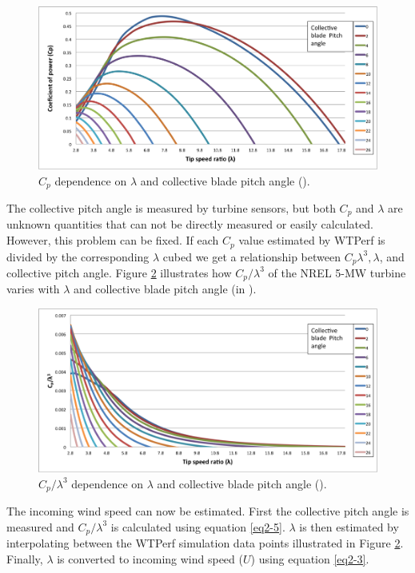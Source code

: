 \begin{figure}[ht]
	\centering
		\includegraphics[width=\textwidth]{Figures/ch2Figures/fig2-13.png}
		
	\caption{$C_p$ dependence on $\lambda$ and collective blade pitch angle (\degree).}
	\label{fig2-13}
\end{figure}

The collective pitch angle is measured by turbine sensors, but both $C_p$ and $\lambda$ are unknown quantities that can not be directly measured or easily calculated. However, this problem can be fixed. If each $C_p$ value estimated by WTPerf is divided by the corresponding $\lambda$ cubed we get a relationship between $C_p\lambda^3, \lambda$, and collective pitch angle. Figure \ref{fig2-14}  illustrates how $C_p / \lambda^3$ of the NREL 5-MW turbine varies with $\lambda$ and collective blade pitch angle (in \degree). 

\begin{figure}[ht]
	\centering
		\includegraphics[width=\textwidth]{Figures/ch2Figures/fig2-14.png}
		
	\caption{$C_p / \lambda^3$ dependence on $\lambda$ and collective blade pitch angle (\degree).}
	\label{fig2-14}
\end{figure}

The incoming wind speed can now be estimated. First the collective pitch angle is measured and $C_p / \lambda^3$ is calculated using equation \ref{eq2-5}. $\lambda$ is then estimated by interpolating between the WTPerf simulation data points illustrated in Figure \ref{fig2-14}. Finally, $\lambda$ is converted to incoming wind speed ($U$) using equation \ref{eq2-3}. 


